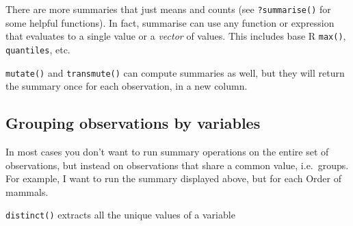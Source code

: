 \documentclass[]{book}
\newenvironment{Shaded}{}{}
\newcommand{\CommentTok}[1]{\textcolor[rgb]{0.38,0.63,0.69}{\textit{#1}}}
\newcommand{\KeywordTok}[1]{\textcolor[rgb]{0.00,0.44,0.13}{\textbf{#1}}}
\newcommand{\NormalTok}[1]{#1}
\newcommand{\OperatorTok}[1]{\textcolor[rgb]{0.40,0.40,0.40}{#1}}
\newcommand{\StringTok}[1]{\textcolor[rgb]{0.25,0.44,0.63}{#1}}
\begin{document}
There are more summaries that just means and counts
(see \texttt{?summarise()} for some helpful functions). In fact, summarise can
use any function or expression that evaluates to a single value or a \emph{vector}
of values. This includes base R \texttt{max()}, \texttt{quantiles}, etc.

\texttt{mutate()} and \texttt{transmute()} can compute summaries as well, but they will
return the summary once for each observation, in a new column.

\begin{Shaded}
\end{Shaded}

\hypertarget{grouping-observations-by-variables}{%
\subsection{Grouping observations by variables}\label{grouping-observations-by-variables}}

In most cases you don't want to run summary operations on the entire set of observations, but instead on observations that share a common value, i.e.~groups.
For example, I want to run the summary displayed above, but for each Order of mammals.

\texttt{distinct()} extracts all the unique values of a variable

\begin{Shaded}
\end{Shaded}
\end{document}
